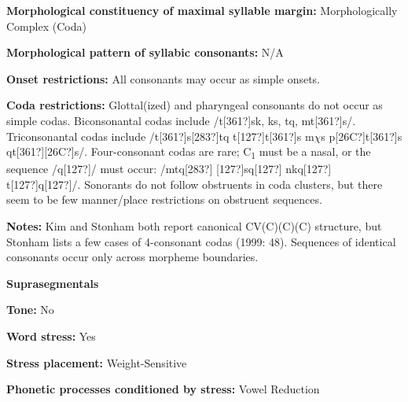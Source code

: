 \begin{styleBody}
\textbf{Morphological constituency of maximal syllable margin:} Morphologically Complex (Coda)
\end{styleBody}

\begin{styleBody}
\textbf{Morphological pattern of syllabic consonants:} N/A
\end{styleBody}

\begin{styleBody}
\textbf{Onset restrictions: }All consonants may occur as simple onsets.
\end{styleBody}

\begin{styleBody}
\textbf{Coda restrictions: }Glottal(ized) and pharyngeal consonants do not occur as simple codas. Biconsonantal codas include /t[361?]sk, ks, tq, mt[361?]s/. Triconsonantal codas include /t[361?]s[283?]tq t[127?]t[361?]s m$\chi $s p[26C?]t[361?]s qt[361?][26C?]s/. Four-consonant codas are rare; C\textsubscript{1} must be a nasal, or the sequence /q[127?]/ must occur: /mtq[283?] [127?]sq[127?] nkq[127?] t[127?]q[127?]/. Sonorants do not follow obstruents in coda clusters, but there seem to be few manner/place restrictions on obstruent sequences.
\end{styleBody}

\begin{styleBody}
\textbf{Notes: }Kim and Stonham both report canonical CV(C)(C)(C) structure, but Stonham lists a few cases of 4-consonant codas (1999: 48). Sequences of identical consonants occur only across morpheme boundaries.
\end{styleBody}

\begin{styleBody}
\textbf{Suprasegmentals}
\end{styleBody}

\begin{styleBody}
\textbf{Tone:} No
\end{styleBody}

\begin{styleBody}
\textbf{Word stress:} Yes
\end{styleBody}

\begin{styleBody}
\textbf{Stress placement:} Weight-Sensitive
\end{styleBody}

\begin{styleBody}
\textbf{Phonetic processes conditioned by stress:} Vowel Reduction
\end{styleBody}

